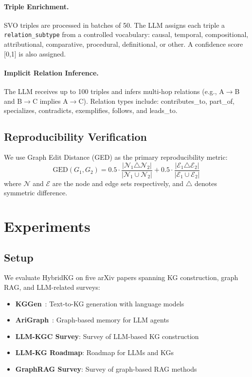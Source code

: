 \documentclass{article}
\newcommand{\method}{HybridKG\xspace}
\begin{document}
\paragraph{Triple Enrichment.} SVO triples are processed in batches of 50. The LLM assigns each triple a \texttt{relation\_subtype} from a controlled vocabulary: causal, temporal, compositional, attributional, comparative, procedural, definitional, or other. A confidence score [0,1] is also assigned.

\paragraph{Implicit Relation Inference.} The LLM receives up to 100 triples and infers multi-hop relations (e.g., A$\rightarrow$B and B$\rightarrow$C implies A$\rightarrow$C). Relation types include: contributes\_to, part\_of, specializes, contradicts, exemplifies, follows, and leads\_to.

\subsection{Reproducibility Verification}

We use Graph Edit Distance (GED) as the primary reproducibility metric:
\begin{equation}
\text{GED}(G_1, G_2) = 0.5 \cdot \frac{|\mathcal{N}_1 \triangle \mathcal{N}_2|}{|\mathcal{N}_1 \cup \mathcal{N}_2|} + 0.5 \cdot \frac{|\mathcal{E}_1 \triangle \mathcal{E}_2|}{|\mathcal{E}_1 \cup \mathcal{E}_2|}
\end{equation}
where $\mathcal{N}$ and $\mathcal{E}$ are the node and edge sets respectively, and $\triangle$ denotes symmetric difference.

\section{Experiments}

\subsection{Setup}

We evaluate \method on five arXiv papers spanning KG construction, graph RAG, and LLM-related surveys:
\begin{itemize}
    \item \textbf{KGGen}~\cite{mo2025kggen}: Text-to-KG generation with language models
    \item \textbf{AriGraph}~\cite{anokhin2025arigraph}: Graph-based memory for LLM agents
    \item \textbf{LLM-KGC Survey}: Survey of LLM-based KG construction
    \item \textbf{LLM-KG Roadmap}: Roadmap for LLMs and KGs
    \item \textbf{GraphRAG Survey}: Survey of graph-based RAG methods
\end{itemize}
\end{document}
